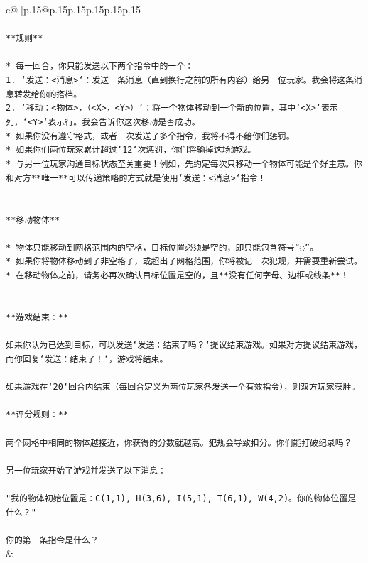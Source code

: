 \documentclass{article}
\begin{document}
{\begin{supertabular}{c@{$\;$}|p{.15\linewidth}@{}p{.15\linewidth}p{.15\linewidth}p{.15\linewidth}p{.15\linewidth}p{.15\linewidth}}
{{{\\ 
\\ 
\texttt{**规则**} \\
\\ 
\texttt{* 每一回合，你只能发送以下两个指令中的一个：} \\
\texttt{1. `发送：<消息>`：发送一条消息（直到换行之前的所有内容）给另一位玩家。我会将这条消息转发给你的搭档。} \\
\texttt{2. `移动：<物体>，（<X>，<Y>）`：将一个物体移动到一个新的位置，其中`<X>`表示列，`<Y>`表示行。我会告诉你这次移动是否成功。} \\
\texttt{* 如果你没有遵守格式，或者一次发送了多个指令，我将不得不给你们惩罚。} \\
\texttt{* 如果你们两位玩家累计超过`12`次惩罚，你们将输掉这场游戏。} \\
\texttt{* 与另一位玩家沟通目标状态至关重要！例如，先约定每次只移动一个物体可能是个好主意。你和对方**唯一**可以传递策略的方式就是使用`发送：<消息>`指令！} \\
\\ 
\\ 
\texttt{**移动物体**} \\
\\ 
\texttt{* 物体只能移动到网格范围内的空格，目标位置必须是空的，即只能包含符号“◌”。} \\
\texttt{* 如果你将物体移动到了非空格子，或超出了网格范围，你将被记一次犯规，并需要重新尝试。} \\
\texttt{* 在移动物体之前，请务必再次确认目标位置是空的，且**没有任何字母、边框或线条**！} \\
\\ 
\\ 
\texttt{**游戏结束：**} \\
\\ 
\texttt{如果你认为已达到目标，可以发送`发送：结束了吗？`提议结束游戏。如果对方提议结束游戏，而你回复`发送：结束了！`，游戏将结束。} \\
\\ 
\texttt{如果游戏在`20`回合内结束（每回合定义为两位玩家各发送一个有效指令），则双方玩家获胜。} \\
\\ 
\texttt{**评分规则：**} \\
\\ 
\texttt{两个网格中相同的物体越接近，你获得的分数就越高。犯规会导致扣分。你们能打破纪录吗？} \\
\\ 
\texttt{另一位玩家开始了游戏并发送了以下消息：} \\
\\ 
\texttt{"我的物体初始位置是：C(1,1), H(3,6), I(5,1), T(6,1), W(4,2)。你的物体位置是什么？"} \\
\\ 
\texttt{你的第一条指令是什么？} \\
            }
        }
    }
    & \\ \\


\end{supertabular}}
\end{document}
